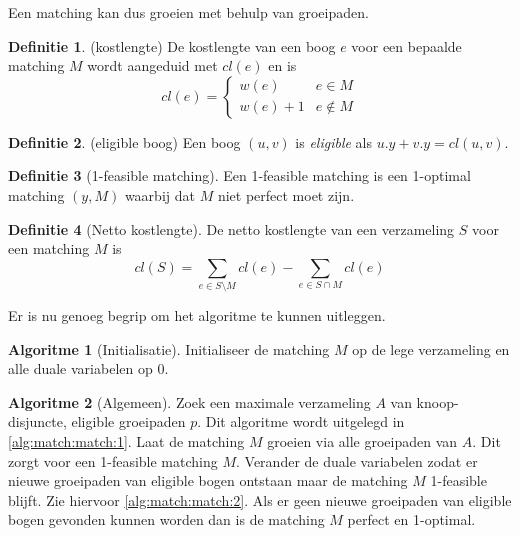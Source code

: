 \documentclass[conference]{IEEEtran}
\theoremstyle{definition}
\newtheorem{definition}{Definitie}[section]
\newtheorem{algorithmm}{Algoritme}[section]
\theoremstyle{remark}
\let \oldforall \forall
\renewcommand{\forall}{\oldforall\,}
\begin{document}
Een matching kan dus groeien met behulp van groeipaden.

\begin{definition}(kostlengte)
    De kostlengte van een boog $e$ voor een bepaalde matching $M$ wordt aangeduid met $cl(e)$ en is
    \begin{equation*}
        cl(e) = \begin{cases}
            w(e) & e \in M \\
            w(e) + 1 & e \notin M
        \end{cases}
    \end{equation*}
\end{definition}

\begin{definition}(eligible boog)
    Een boog $(u, v)$ is \textit{eligible} als $u.y + v.y = cl(u, v)$.
\end{definition}

\begin{definition}[1-feasible matching]
    Een 1-feasible matching is een 1-optimal matching $(y, M)$ waarbij dat $M$ niet perfect moet zijn.
\end{definition}

\begin{definition}[Netto kostlengte]
    De netto kostlengte van een verzameling $S$ voor een matching $M$ is
    \begin{equation*}
        cl(S) = \sum_{e \in S \setminus M} cl(e) - \sum_{e \in S \cap M} cl(e)
    \end{equation*}
\end{definition}

Er is nu genoeg begrip om het algoritme te kunnen uitleggen.


\begin{algorithmm}[Initialisatie]
    Initialiseer de matching $M$ op de lege verzameling en alle duale variabelen op $0$.
\end{algorithmm}

\begin{algorithmm}[Algemeen]
    Zoek een maximale verzameling $A$ van knoop-disjuncte, eligible groeipaden $p$. Dit algoritme wordt uitgelegd in \ref{alg:match:match:1}. Laat de matching $M$ groeien via alle groeipaden van $A$. Dit zorgt voor een 1-feasible matching $M$. Verander de duale variabelen zodat er nieuwe groeipaden van eligible bogen ontstaan maar de matching $M$ 1-feasible blijft. Zie hiervoor \ref{alg:match:match:2}. Als er geen nieuwe groeipaden van eligible bogen gevonden kunnen worden dan is de matching $M$ perfect en 1-optimal.
\end{algorithmm}
\end{document}
